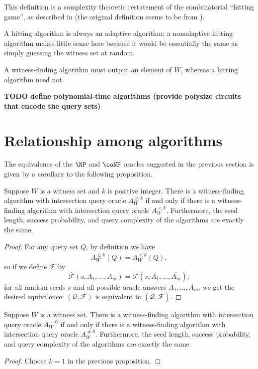 \documentclass{article}
\newcommand{\todo}[1]{\textbf{TODO #1}}
\newcommand{\mc}{\mathcal}
\begin{document}
This definition is a complexity theoretic restatement of the combinatorial ``hitting game'', as described in \autocite[Section~3]{newport14} (the original definition seems to be from \autocite[Definition~5]{bgi92}).

A hitting algorithm is always an adaptive algorithm; a nonadaptive hitting algorithm makes little sense here because it would be essentially the same as simply guessing the witness set at random.

A witness-finding algorithm must output an element of $W$, whereas a hitting algorithm need not.

\todo{define polynomial-time algorithms (provide polysize circuits that encode the query sets)}

\section{Relationship among algorithms}

The equivalence of the $\NP$ and $\coNP$ oracles suggested in the previous section is given by a corollary to the following proposition.

\begin{proposition}
  Suppose $W$ is a witness set and $k$ is positive integer.
  There is a witness-finding algorithm with intersection query oracle $A^{\geq k}_W$ if and only if there is a witness-finding algorithm with intersection query oracle $A^{< k}_W$.
  Furthermore, the seed length, success probability, and query complexity of the algorithms are exactly the same.
\end{proposition}
\begin{proof}
  For any query set $Q$, by definition we have
  \begin{equation*}
    \overline{A^{\geq k}_W(Q)} = A^{< k}_W(Q),
  \end{equation*}
  so if we define $\overline{\mc{F}}$ by
  \begin{equation*}
    \overline{\mc{F}}(s, A_1, \dotsc, A_m) = \mc{F}(s, \overline{A_1}, \dotsc, \overline{A_m}),
  \end{equation*}
  for all random seeds $s$ and all possible oracle answers $A_1, \dotsc, A_m$, we get the desired equivalence: $(\mc{Q}, \mc{F})$ is equivalent to $(\mc{Q}, \overline{\mc{F}})$.
\end{proof}

\begin{corollary}
  Suppose $W$ is a witness set.
  There is a witness-finding algorithm with intersection query oracle $A^{= 0}_W$ if and only if there is a witness-finding algorithm with intersection query oracle $A^{\neq 0}_W$.
  Furthermore, the seed length, success probability, and query complexity of the algorithms are exactly the same.
\end{corollary}
\begin{proof}
  Choose $k = 1$ in the previous proposition.
\end{proof}
\end{document}
